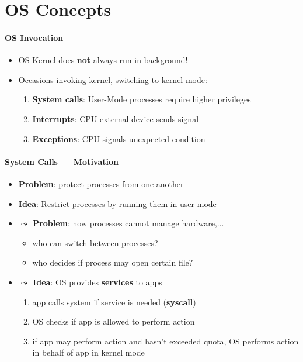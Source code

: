 \section{OS Concepts}

\paragraph{OS Invocation}
\begin{itemize}
	\item OS Kernel does \textbf{not} always run in background!
	\item Occasions invoking kernel, switching to kernel mode:
	\begin{enumerate}
		\item \textbf{System calls}: User-Mode processes require higher privileges
		\item \textbf{Interrupts}: CPU-external device sends signal
		\item \textbf{Exceptions}: CPU signals unexpected condition
	\end{enumerate}
\end{itemize}

\paragraph{System Calls --- Motivation}
\begin{itemize}
	\item \textbf{Problem}: protect processes from one another
	\item \textbf{Idea}: Restrict processes by running them in user-mode
	\item \textbf{$ \leadsto $ Problem}: now processes cannot manage hardware,...
	\begin{itemize}
		\item who can switch between processes?
		\item who decides if process may open certain file?
	\end{itemize}
	\item \textbf{$ \leadsto $ Idea}: OS provides \textbf{services} to apps
	\begin{enumerate}
		\item app calls system if service is needed (\textbf{syscall})
		\item OS checks if app is allowed to perform action
		\item if app may perform action and hasn't exceeded quota, OS performs action in behalf of app in kernel mode
	\end{enumerate}
\end{itemize}


